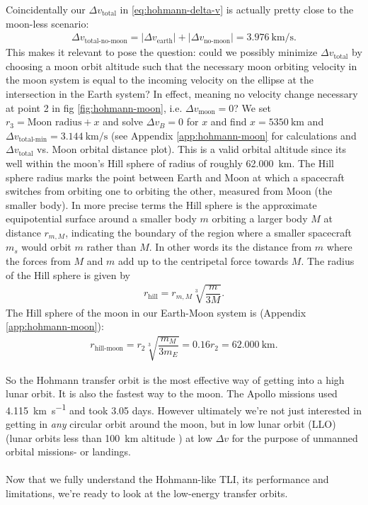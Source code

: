 Coincidentally our $\Delta v_{\text{total}}$ in \ref{eq:hohmann-delta-v} is actually pretty close to the moon-less scenario:
\begin{align}
\Delta v_{\text{total-no-moon}} = |\Delta v_{\text{earth}}| + |\Delta v_{\text{no-moon}}| = \SI{3.976}{\km\per\s}.
\end{align}
This makes it relevant to pose the question: could we possibly minimize $\Delta v_{\text{total}}$ by choosing a moon orbit altitude such that the necessary moon orbiting velocity in the moon system is equal to the incoming velocity on the ellipse at the intersection in the Earth system? In effect, meaning no velocity change necessary at point 2 in fig \ref{fig:hohmann-moon}, i.e. $\Delta v_{\text{moon}} = 0$? We set $r_3 = \text{Moon radius} + x$ and solve $\Delta v_B = 0$ for $x$ and find $x = \SI{5350}{\km}$ and $\Delta v_\text{total-min} = \SI{3.144}{\km\per\second}$ (see Appendix \ref{app:hohmann-moon} for calculations and $\Delta v_\text{total}$ vs. Moon orbital distance plot). This is a valid orbital altitude since its well within the moon's Hill sphere of radius of roughly \SI{62,000}{\km}. The Hill sphere radius marks the point between Earth and Moon at which a spacecraft switches from orbiting one to orbiting the other, measured from Moon (the smaller body). In more precise terms the Hill sphere is the approximate equipotential surface around a smaller body $m$ orbiting a larger body $M$ at distance $r_{m,M}$, indicating the boundary of the region where a smaller spacecraft $m_s$ would orbit $m$ rather than $M$. In other words its the distance from $m$ where the forces from $M$ and $m$ add up to the centripetal force towards $M$. The radius of the Hill sphere is given by \cite{Murray1999}
\begin{align}
r_{\text{hill}} = r_{m,M}\sqrt[3]{\dfrac{m}{3M}}. \label{eq:hill-sphere}
\end{align}
The Hill sphere of the moon in our Earth-Moon system is (Appendix \ref{app:hohmann-moon}):
\begin{align}
r_{\text{hill-moon}} = r_2\sqrt[3]{\dfrac{m_M}{3m_E}} = 0.16 r_2 = \SI{62,000}{\km}.
\end{align}

So the Hohmann transfer orbit is the most effective way of getting into a high lunar orbit. It is also the fastest way to the moon. The Apollo missions used \SI{4.115}{\km\per\s} and took 3.05 days. However ultimately we're not just interested in getting in \emph{any} circular orbit around the moon, but in low lunar orbit (LLO) (lunar orbits less than \SI{100}{\km} altitude \cite{NASA1966}) at low $\Delta v$ for the purpose of unmanned orbital missions- or landings.\\
\\
Now that we fully understand the Hohmann-like TLI, its performance and limitations, we're ready to look at the low-energy transfer orbits.


